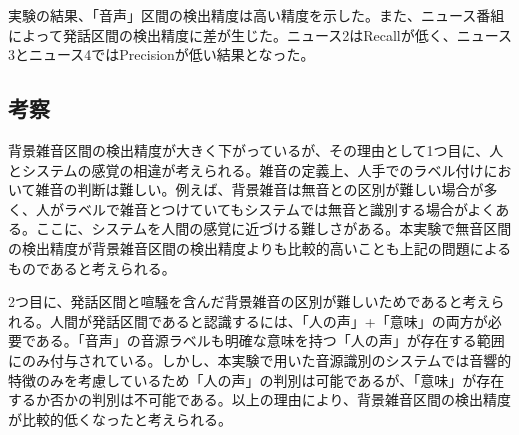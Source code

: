 実験の結果、「音声」区間の検出精度は高い精度を示した。また、ニュース番組によって発話区間の検出精度に差が生じた。ニュース2はRecallが低く、ニュース3とニュース4ではPrecisionが低い結果となった。

\subsection{考察}
背景雑音区間の検出精度が大きく下がっているが、その理由として1つ目に、人とシステムの感覚の相違が考えられる。雑音の定義上、人手でのラベル付けにおいて雑音の判断は難しい。例えば、背景雑音は無音との区別が難しい場合が多く、人がラベルで雑音とつけていてもシステムでは無音と識別する場合がよくある。ここに、システムを人間の感覚に近づける難しさがある。本実験で無音区間の検出精度が背景雑音区間の検出精度よりも比較的高いことも上記の問題によるものであると考えられる。\par
2つ目に、発話区間と喧騒を含んだ背景雑音の区別が難しいためであると考えられる。人間が発話区間であると認識するには、「人の声」+「意味」の両方が必要である。「音声」の音源ラベルも明確な意味を持つ「人の声」が存在する範囲にのみ付与されている。しかし、本実験で用いた音源識別のシステムでは音響的特徴のみを考慮しているため「人の声」の判別は可能であるが、「意味」が存在するか否かの判別は不可能である。以上の理由により、背景雑音区間の検出精度が比較的低くなったと考えられる。
